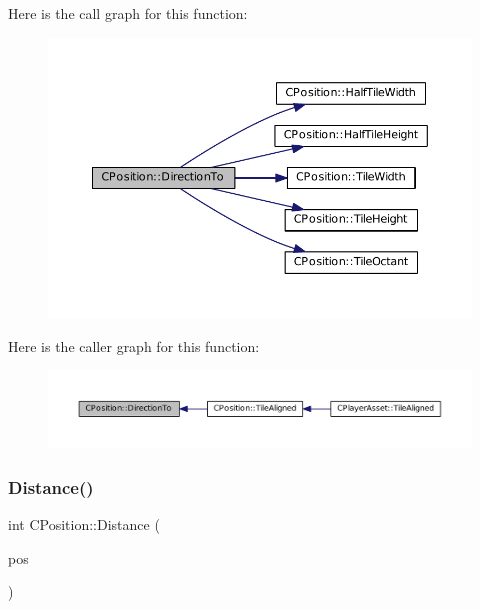 Here is the call graph for this function\+:
\nopagebreak
\begin{figure}[H]
\begin{center}
\leavevmode
\includegraphics[width=350pt]{classCPosition_a65124e3543c2d2e284e5eb517cd7f842_cgraph}
\end{center}
\end{figure}
Here is the caller graph for this function\+:
\nopagebreak
\begin{figure}[H]
\begin{center}
\leavevmode
\includegraphics[width=350pt]{classCPosition_a65124e3543c2d2e284e5eb517cd7f842_icgraph}
\end{center}
\end{figure}
\hypertarget{classCPosition_a9edc6690c78a54ea08b137df83c22e91}{}\label{classCPosition_a9edc6690c78a54ea08b137df83c22e91} 
\subsubsection{\texorpdfstring{Distance()}{Distance()}}
{\footnotesize\ttfamily int C\+Position\+::\+Distance (\begin{DoxyParamCaption}\item[{const \hyperlink{classCPosition}{C\+Position} \&}]{pos }\end{DoxyParamCaption})}



